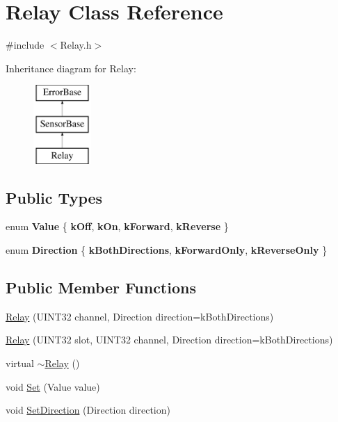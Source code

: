 \hypertarget{classRelay}{\section{\-Relay \-Class \-Reference}
\label{classRelay}
}


{\ttfamily \#include $<$\-Relay.\-h$>$}

\-Inheritance diagram for \-Relay\-:\begin{figure}[H]
\begin{center}
\leavevmode
\includegraphics[height=3.000000cm]{classRelay}
\end{center}
\end{figure}
\subsection*{\-Public \-Types}
\begin{DoxyCompactItemize}
\item 
enum {\bfseries \-Value} \{ {\bfseries k\-Off}, 
{\bfseries k\-On}, 
{\bfseries k\-Forward}, 
{\bfseries k\-Reverse}
 \}
\item 
enum {\bfseries \-Direction} \{ {\bfseries k\-Both\-Directions}, 
{\bfseries k\-Forward\-Only}, 
{\bfseries k\-Reverse\-Only}
 \}
\end{DoxyCompactItemize}
\subsection*{\-Public \-Member \-Functions}
\begin{DoxyCompactItemize}
\item 
\hyperlink{classRelay_a25a4796fc9a4e52948c72d4885784764}{\-Relay} (\-U\-I\-N\-T32 channel, \-Direction direction=k\-Both\-Directions)
\item 
\hyperlink{classRelay_aa787f412ceabd8177195c3668927cb52}{\-Relay} (\-U\-I\-N\-T32 slot, \-U\-I\-N\-T32 channel, \-Direction direction=k\-Both\-Directions)
\item 
virtual \hyperlink{classRelay_a858c668bc7e353db53ed07b1a4ef1dbd}{$\sim$\-Relay} ()
\item 
void \hyperlink{classRelay_a35d0aa67e99f6ed89ccaa489a4275a31}{\-Set} (\-Value value)
\item 
void \hyperlink{classRelay_a2bb78af9da762fe6fb7f3339149720b5}{\-Set\-Direction} (\-Direction direction)
\end{DoxyCompactItemize}


